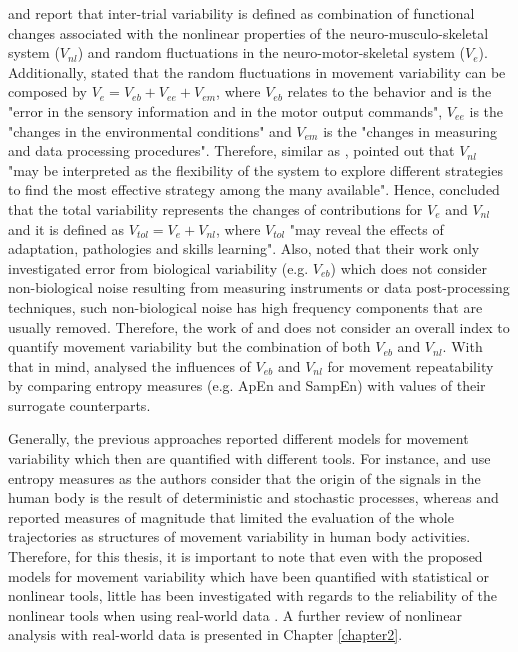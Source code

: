 \cite{preatoni2007} and \cite{preatoni2010, preatoni2013} report  
that inter-trial variability is defined as combination of functional changes 
associated with the nonlinear properties of the neuro-musculo-skeletal 
system ($V_{nl}$) and random fluctuations in the neuro-motor-skeletal 
system ($V_e$).
Additionally, \citealt[p. 72]{preatoni2013} stated that the random fluctuations 
in movement variability can be composed by $V_{e}=V_{eb}+V_{ee}+V_{em}$,
where $V_{eb}$ relates to the behavior and is the "error in the sensory 
information and in the motor output commands",
$V_{ee}$ is the "changes in the environmental conditions" and 
$V_{em}$ is the "changes in measuring and data processing procedures".
Therefore, similar as \cite{hatze1986}, \citealt[p. 77]{preatoni2013} 
pointed out that $V_{nl}$ "may be interpreted as the flexibility of the 
system to explore different strategies to find the most effective 
strategy among the many available".
Hence, \citealt[p. 1328]{preatoni2010} concluded that the total variability 
represents the changes of contributions for $V_e$ and $V_{nl}$ 
and it is defined as $V_{tol}=V_e+V_{nl}$, where $V_{tol}$ 
"may reveal the effects of adaptation, pathologies and skills learning".
Also, \cite{preatoni2013} noted that their work only investigated error from 
biological variability (e.g. $V_{eb}$) which does not consider 
non-biological noise resulting from measuring instruments or 
data post-processing techniques, such 
non-biological noise has high frequency components that are usually removed.
Therefore, the work of \cite{preatoni2010} and \cite{preatoni2013} 
does not consider an overall index to quantify movement variability but 
the combination of both $V_{eb}$ and $V_{nl}$. 
With that in mind, \cite{preatoni2007} analysed the influences of 
$V_{eb}$ and $V_{nl}$ for movement repeatability by comparing entropy measures 
(e.g. ApEn and SampEn) with values of their surrogate counterparts.

Generally, the previous approaches reported different models 
for movement variability which then are quantified with different tools.
For instance, \cite{hatze1986} and \cite{preatoni2010, preatoni2013} 
use entropy measures as the authors consider that the origin of the 
signals in the human body is the result of deterministic and 
stochastic processes, whereas 
\cite{muller2004} and \cite{seifert2011} reported 
measures of magnitude that limited the evaluation of the 
whole trajectories as structures of movement variability in 
human body activities.
Therefore, for this thesis, it is important to note that
even with the proposed models for movement variability 
\citep{hatze1986, preatoni2010, preatoni2013, muller2004, seifert2011} 
which have been quantified with statistical or nonlinear tools,
little has been investigated with regards to the reliability of the nonlinear 
tools when using real-world data \citep{newell1998}.
A further review of nonlinear analysis with real-world data 
is presented in Chapter \ref{chapter2}.

